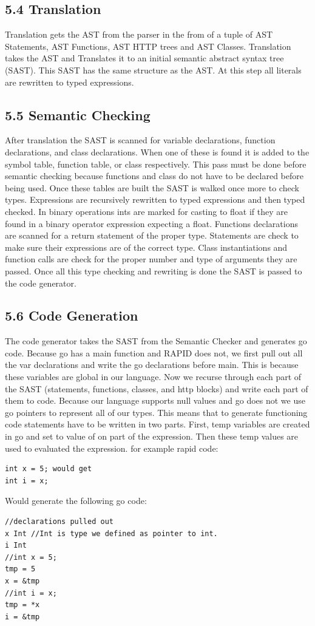 \subsection*{5.4 Translation}

Translation gets the AST from the parser in the from of a tuple of AST Statements, AST Functions, AST HTTP trees and AST Classes.  Translation takes the AST and Translates it to an initial semantic abstract syntax tree (SAST). This SAST has the same structure as the AST.  At this step all literals are rewritten to typed expressions.  

\subsection*{5.5 Semantic Checking}

After translation the SAST is scanned for variable declarations, function declarations, and class declarations.  When one of these is found it is added to the symbol table, function table, or class respectively.  This pass must be done before semantic checking because functions and class do not have to be declared before being used.  Once these tables are built the SAST is walked once more to check types.  Expressions are recursively rewritten to typed expressions and then typed checked. In binary operations ints are marked for casting to float if they are found in a binary operator expression expecting a float.  Functions declarations are scanned for a return statement of the proper type.  Statements are check to make sure their expressions are of the correct type.  Class instantiations and function calls are check for the proper number and type of arguments they are passed.  Once all this type checking and rewriting is done the SAST is passed to the code generator.

\subsection*{5.6 Code Generation}

The code generator takes the SAST from the Semantic Checker and generates go code.  Because go has a main function and RAPID does not, we first pull out all the var declarations and write the go declarations before main. This is because these variables are global in our language. Now we recurse through each part of the SAST (statements, functions, classes, and http blocks) and write each part of them to code.  Because our language supports null values and go does not we use go pointers to represent all of our types.  This means that to generate functioning code statements have to be written in two parts.  First, temp variables are created in go and set to value of on part of the expression.  Then these temp values are used to evaluated the expression.  for example rapid code:
\begin{verbatim}
int x = 5; would get 
int i = x;
\end{verbatim}

Would generate the following go code:
\begin{verbatim}
//declarations pulled out
x Int //Int is type we defined as pointer to int.
i Int
//int x = 5; 
tmp = 5
x = &tmp
//int i = x;
tmp = *x
i = &tmp
\end{verbatim} 
